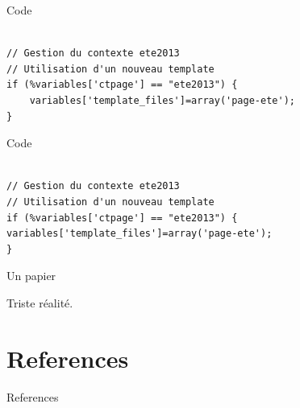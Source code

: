 \documentclass[9pt]{beamer}
\begin{document}
\begin{frame}[fragile]{Code}
\begin{lstlisting}

// Gestion du contexte ete2013
// Utilisation d'un nouveau template
if (%variables['ctpage'] == "ete2013") {
    variables['template_files']=array('page-ete');
}
\end{lstlisting}
\end{frame}

\begin{frame}[fragile]{Code}
\begin{verbatim}

// Gestion du contexte ete2013
// Utilisation d'un nouveau template
if (%variables['ctpage'] == "ete2013") {
variables['template_files']=array('page-ete');
}
\end{verbatim}
\end{frame}

\begin{frame}{Un papier}

\begin{alertblock}{ \cite{Ioannidis_2005}}

Triste réalité.	
	
\end{alertblock}

\end{frame}

\section{References}

\begin{frame}[allowframebreaks]{References}

\printbibliography[heading=none]

\end{frame}

\end{document}
